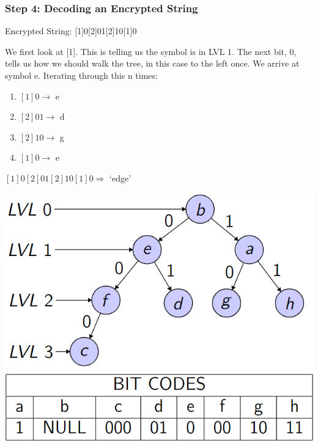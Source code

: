 \documentclass{beamer}
\begin{document}
\begin{frame}
    \frametitle{Step 4: Decoding an Encrypted String}

    \begin{minipage}[t]{0.6\linewidth}
        Encrypted String: [1]0[2]01[2]10[1]0

        We first look at [1]. This is telling us the symbol is in LVL 1. The next bit, 0, tells us how we should walk the tree, in this case to the left once. We arrive at symbol e. Iterating through this n times:

        \begin{enumerate}
            \item $[1]0 \rightarrow$ e
            \item $[2]01 \rightarrow$ d
            \item $[2]10 \rightarrow$ g
            \item $[1]0 \rightarrow$ e
        \end{enumerate}

        $[1]0[2]01[2]10[1]0 \Rightarrow$ `edge' 
    \end{minipage}
    \hfill
    \begin{minipage}[t]{0.35\linewidth}
        \vspace{0pt}
        \begin{flushright}
            \includegraphics[scale=0.3]{images/bintree.png}
            \includegraphics[scale=0.25]{images/bitcode.png}
        \end{flushright}
    \end{minipage}
\end{frame}
\end{document}
